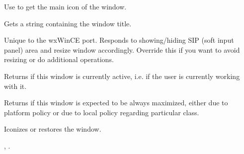 Use  to get the main icon of the
window.




\label{wxtoplevelwindowgettitle}


Gets a string containing the window title.




\label{wxtoplevelwindowhandlesettingchange}


Unique to the wxWinCE port. Responds to showing/hiding SIP (soft input panel) area and resize
window accordingly. Override this if you want to avoid resizing or do additional
operations.


\label{wxtoplevelwindowisactive}


Returns \true if this window is currently active, i.e. if the user is currently
working with it.


\label{wxtoplevelwindowisalwaysmaximized}


Returns \true if this window is expected to be always maximized, either due to platform policy
or due to local policy regarding particular class.


\label{wxtoplevelwindowiconize}


Iconizes or restores the window.




, .


